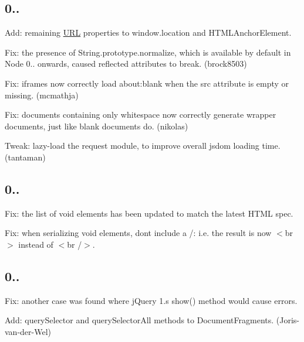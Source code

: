 \subsection*{0..}


\begin{DoxyItemize}
\item Add\+: remaining \mbox{\hyperlink{namespace_u_r_l}{U\+RL}} properties to {\ttfamily window.\+location} and {\ttfamily H\+T\+M\+L\+Anchor\+Element}.
\item Fix\+: the presence of {\ttfamily String.\+prototype.\+normalize}, which is available by default in Node 0.. onwards, caused reflected attributes to break. (brock8503)
\item Fix\+: iframes now correctly load {\ttfamily about\+:blank} when the {\ttfamily src} attribute is empty or missing. (mcmathja)
\item Fix\+: documents containing only whitespace now correctly generate wrapper documents, just like blank documents do. (nikolas)
\item Tweak\+: lazy-\/load the request module, to improve overall jsdom loading time. (tantaman)
\end{DoxyItemize}

\subsection*{0..}


\begin{DoxyItemize}
\item Fix\+: the list of void elements has been updated to match the latest H\+T\+ML spec.
\item Fix\+: when serializing void elements, don\textquotesingle{}t include a {\ttfamily /}\+: i.\+e. the result is now {\ttfamily $<$br$>$} instead of {\ttfamily $<$br /$>$}.
\end{DoxyItemize}

\subsection*{0..}


\begin{DoxyItemize}
\item Fix\+: another case was found where j\+Query 1.\textquotesingle{}s {\ttfamily show()} method would cause errors.
\item Add\+: {\ttfamily query\+Selector} and {\ttfamily query\+Selector\+All} methods to {\ttfamily Document\+Fragment}s. (Joris-\/van-\/der-\/\+Wel)
\end{DoxyItemize}

